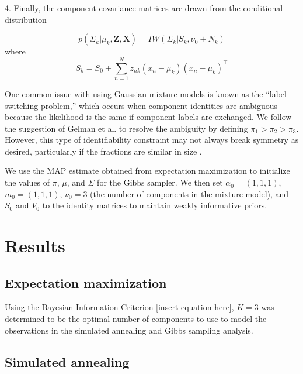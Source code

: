 \documentclass[twoside]{article}
\theoremstyle{theorem}
\theoremstyle{theorem}
\theoremstyle{theorem}
\theoremstyle{lemma}
\theoremstyle{definition}
\theoremstyle{example}
\begin{document}
 4. Finally, the component covariance matrices are drawn from the conditional distribution 
 
 \begin{equation}
 p(\Sigma_k | \mu_k, \mathbf{Z}, \mathbf{X}) = IW(\Sigma_k | S_k, \nu_0+N_k)
 \end{equation}
 where 
 \begin{equation}
S_k = S_0 + \sum_{n=1}^N z_{nk}(x_n - \mu_k)(x_n - \mu_k)^\top
\end{equation}



One common issue with using Gaussian mixture models is known as the ``label-switching problem,'' which occurs when component identities are ambiguous because the likelihood is the same if component labels are exchanged. We follow the suggestion of Gelman et al. \cite{Gelman} to resolve the ambiguity by defining $\pi_1 > \pi_2 > \pi_3$. However, this type of identifiability constraint may not always break symmetry as desired, particularly if the fractions are similar in size \cite{Stephens}. 

We use the MAP estimate obtained from expectation maximization to initialize the values of $\pi$, $\mu$, and $\Sigma$ for the Gibbs sampler. We then set $\alpha_0 = (1,1,1)$, $m_0 = (1,1,1)$, $\nu_0 = 3$ (the number of components in the mixture model), and $S_0$ and $V_0$ to the identity matrices to maintain weakly informative priors.   

\section{Results}
\subsection{Expectation maximization}
Using the Bayesian Information Criterion [insert equation here], $K = 3$ was determined to be the optimal number of components to use to model the observations in the simulated annealing and Gibbs sampling analysis. 
\subsection{Simulated annealing}
\end{document}
